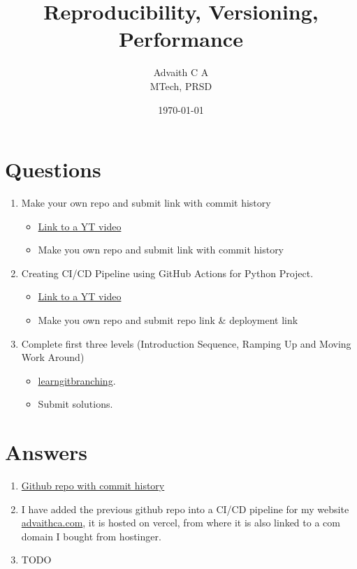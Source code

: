 \documentclass{article}
\title{Reproducibility, Versioning, Performance}
\author{Advaith C A \\MTech, PRSD}
\date{\today}
\begin{document}
    \maketitle
    \section*{Questions}
    \begin{enumerate}
        \item Make your own repo and submit link with commit history
        \begin{itemize}
            \item \href{https://www.youtube.com/watch?v=8Dd7KRpKeaE}{Link to a YT video}
            \item Make you own repo and submit link with commit history
        \end{itemize}
        \item Creating CI/CD Pipeline using GitHub Actions for Python Project.
        \begin{itemize}
            \item \href{https://www.youtube.com/watch?v=WTofttoD2xg}{Link to a YT video}
            \item Make you own repo and submit repo link \& deployment link
        \end{itemize}
        \item Complete first three levels (Introduction Sequence, Ramping Up and Moving Work Around)
        \begin{itemize}
            \item \href{https://learngitbranching.js.org/}{learngitbranching}.
            \item Submit solutions.
        \end{itemize}
    \end{enumerate}

    \section*{Answers}
    \begin{enumerate}
        \item \href{https://github.com/advaithca/advaithca.github.io/tree/master}{Github repo with commit history}
        \item I have added the previous github repo into a CI/CD pipeline for my website \href{https://advaithca.com}{advaithca.com}, it is hosted on vercel, from where it is also linked to a com domain I bought from hostinger.
        \item TODO
    \end{enumerate}
\end{document}
